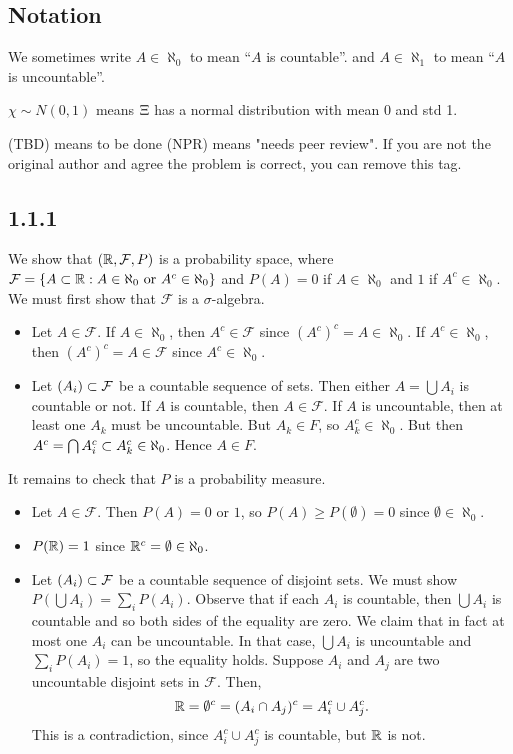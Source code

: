 \documentclass[11pt]{article}
\begin{document}
\subsection*{Notation}

We sometimes write $A \in \aleph_0$ to mean ``$A$ is countable''. and $A \in \aleph_1$ to mean ``$A$ is uncountable''. 

$\chi \sim N(0,1)$ means $\Xi$ has a normal distribution with mean 0 and std 1.

(TBD) means to be done
(NPR) means "needs peer review". If you are not the original author and agree the problem is correct, you can remove this tag.

\subsection*{1.1.1}

We show that $({\mathbb R}, \mathcal{F}, P)$ is a probability space, where $\mathcal{F} = \{A \subset {\mathbb R} : A \in \aleph_0 \text{ or } A^c \in \aleph_0\}$ and $P(A) = 0$ if $A \in \aleph_0$ and $1$ if $A^c \in \aleph_0$. We must first show that $\mathcal{F}$ is a $\sigma$-algebra. 

\begin{itemize}
    \item Let $A \in \mathcal{F}$. If $A \in \aleph_0$, then $A^c \in \mathcal{F}$ since $(A^c)^c = A \in \aleph_0$. If $A^c \in \aleph_0$, then $(A^c)^c = A \in \mathcal{F}$ since $A^c \in \aleph_0$.
    \item Let $(A_i) \subset \mathcal{F}$ be a countable sequence of sets. Then either $A = \bigcup A_i$ is countable or not. If $A$ is countable, then $A \in \mathcal{F}$. If $A$ is uncountable, then at least one $A_k$ must be uncountable. But $A_k \in F$, so $A_k^c \in \aleph_0$. But then $A^c = \bigcap A_i^c \subset A_k^c \in \aleph_0$. Hence $A \in F$.
\end{itemize} 

It remains to check that $P$ is a probability measure. 

\begin{itemize}
    \item Let $A \in \mathcal{F}$. Then $P(A) = 0$ or $1$, so $P(A) \geq P(\emptyset) = 0$ since $\emptyset \in \aleph_0$.
    \item $P({\mathbb R}) = 1$ since ${\mathbb R}^c = \emptyset \in \aleph_0$.
    \item Let $(A_i) \subset \mathcal{F}$ be a countable sequence of disjoint sets. We must show $P(\bigcup A_i) = \sum_i P(A_i)$. Observe that if each $A_i$ is countable, then $\bigcup A_i$ is countable and so both sides of the equality are zero. We claim that in fact at most one $A_i$ can be uncountable. In that case, $\bigcup A_i$ is uncountable and $\sum_i P(A_i) = 1$, so the equality holds. Suppose $A_i$ and $A_j$ are two uncountable disjoint sets in $\mathcal{F}$. Then, \[{\mathbb R} = \emptyset^c = (A_i \cap A_j)^c = A_i^c \cup A_j^c.\] This is a contradiction, since $A_i^c \cup A_j^c$ is countable, but ${\mathbb R}$ is not. 
\end{itemize}
\end{document}

